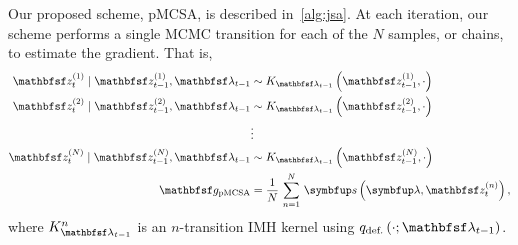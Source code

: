\begin{proofEnd}

  Our proposed scheme, pMCSA, is described in~\cref{alg:jsa}. 
  At each iteration, our scheme performs a single MCMC transition for each of the \(N\) samples, or chains, to estimate the gradient.
  That is,
  \begin{align*}
    \rvvz^{(1)}_{t} \mid \rvvz_{t-1}^{(1)}, \rvvlambda_{t-1} &\sim K_{\rvvlambda_{t-1}}\left(\rvvz_{t-1}^{(1)}, \cdot\right) \\
    \rvvz^{(2)}_{t} \mid \rvvz_{t-1}^{(2)}, \rvvlambda_{t-1}  &\sim K_{\rvvlambda_{t-1}}\left(\rvvz_{t-1}^{(2)}, \cdot\right) \\
    &\vdots
    \\
    \rvvz^{(N)}_{t} \mid \rvvz^{(N)}_{t-1}, \rvvlambda_{t-1}  &\sim K_{\rvvlambda_{t-1}}\left(\rvvz_{t-1}^{(N)}, \cdot\right)
    \\
    \rvvg_{\text{pMCSA}} &= \frac{1}{N}\,\sum^{N}_{n=1} \, \vs\left(\vlambda, \rvvz^{(n)}_t\right),
  \end{align*}
  where \(K_{\rvvlambda_{t-1}}^n\) is an \(n\)-transition IMH kernel using \(q_{\text{def.}}\left(\cdot; \rvvlambda_{t-1}\right)\).


\end{proofEnd}
